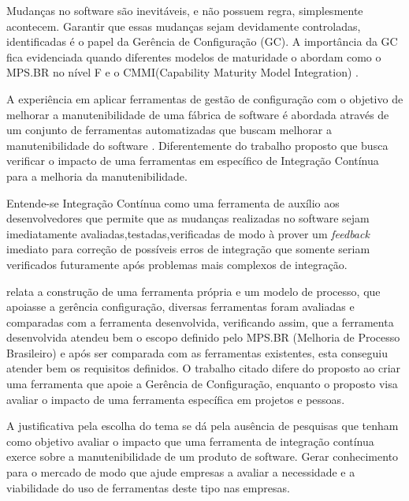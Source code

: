 Mudanças no software são inevitáveis, e não possuem regra, simplesmente acontecem. Garantir que essas mudanças sejam devidamente controladas, identificadas é o papel da  Gerência de Configuração (GC). A importância da GC fica evidenciada quando diferentes modelos de maturidade o abordam como o MPS.BR no nível F e o CMMI(Capability Maturity Model Integration) \cite{furlaneto2006}.

A experiência em aplicar ferramentas  de gestão de configuração com o objetivo de melhorar a manutenibilidade de uma fábrica de software é abordada através de um conjunto de ferramentas automatizadas que buscam melhorar a manutenibilidade do software \cite{poliana2005}. Diferentemente do trabalho proposto que busca verificar o impacto de uma ferramentas em específico de Integração Contínua  para a melhoria da manutenibilidade.

Entende-se Integração Contínua como uma ferramenta de auxílio aos desenvolvedores que permite que as mudanças realizadas no software sejam imediatamente avaliadas,testadas,verificadas de modo à prover um  \textit{feedback} imediato para correção de possíveis erros de integração que somente seriam verificados futuramente após problemas mais complexos de integração\cite{paul2007}.

 relata a construção de uma ferramenta própria e um modelo de processo, que apoiasse a gerência configuração, diversas ferramentas foram avaliadas e comparadas com a ferramenta desenvolvida, verificando assim, que a ferramenta desenvolvida atendeu bem o escopo definido pelo MPS.BR (Melhoria de Processo Brasileiro)  e após ser comparada com as ferramentas existentes, esta conseguiu atender bem os requisitos definidos. O trabalho citado difere do proposto ao criar uma ferramenta que apoie a Gerência de Configuração, enquanto o proposto visa avaliar o impacto de uma ferramenta específica em projetos e pessoas.

A justificativa pela escolha do tema se dá pela ausência de pesquisas que tenham como objetivo avaliar o impacto que uma ferramenta de integração contínua exerce sobre a manutenibilidade de um produto de software. Gerar conhecimento para o mercado de modo que ajude empresas a avaliar a necessidade e a viabilidade do uso de ferramentas deste tipo nas empresas.
